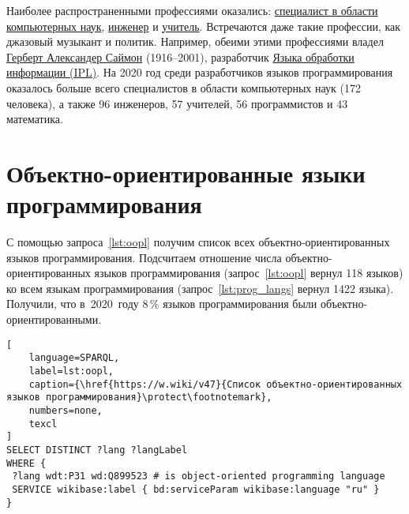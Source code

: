 Наиболее распространенными профессиями оказались: 
\href{https://www.wikidata.org/wiki/Q21198}{специалист в области компьютерных наук}, 
\href{https://www.wikidata.org/wiki/Q81096}{инженер} 
и \href{https://www.wikidata.org/wiki/Q37226}{учитель}. 
Встречаются даже такие профессии, как джазовый музыкант и политик. 
Например, обеими этими профессиями владел 
\href{https://www.wikidata.org/wiki/Q181529}{Герберт Александер Саймон} (1916--2001), 
разработчик \href{https://en.wikipedia.org/wiki/Information_Processing_Language}{Языка обработки информации (IPL)}. 
На 2020 год среди разработчиков языков программирования оказалось больше всего специалистов 
в области компьютерных наук (172 человека), а также 96 инженеров, 57 учителей, 56 программистов и 43 математика.



\section{Объектно-ориентированные языки программирования}

С помощью запроса~\ref{lst:oopl} 
получим список всех объектно-ориентированных языков программирования. 
Подсчитаем отношение числа объектно-ориентированных языков программирования 
(запрос~\ref{lst:oopl} вернул 118 языков) 
ко всем языкам программирования 
(запрос~\ref{lst:prog_langs} вернул 1422 языка).
Получили, что в~2020~году 8\,\% языков программирования были объектно-ориентированными. 

\begin{lstlisting}[
	language=SPARQL,
	label=lst:oopl,
	caption={\href{https://w.wiki/v47}{Список объектно-ориентированных языков программирования}\protect\footnotemark},
    numbers=none,
	texcl
]
SELECT DISTINCT ?lang ?langLabel
WHERE {
 ?lang wdt:P31 wd:Q899523 # is object-oriented programming language
 SERVICE wikibase:label { bd:serviceParam wikibase:language "ru" }
}
\end{lstlisting}







